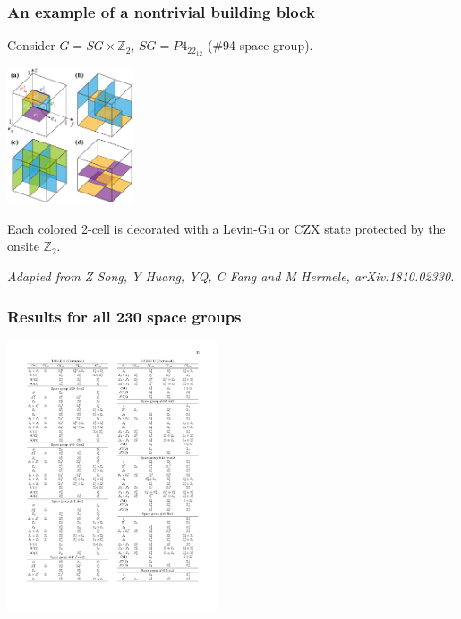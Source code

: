 \documentclass[xcolor=table, 10pt, aspectratio=43]{beamer}
\begin{document}
\begin{frame}
\frametitle{An example of a nontrivial building block}
Consider $G=SG\times\mathbb Z_2$, $SG=P4_22_12$ (\#94 space group).
\begin{center}
\includegraphics[height=4cm]{blocks}
\end{center}
Each colored 2-cell is decorated with a Levin-Gu or CZX state protected by the onsite $\mathbb Z_2$.

\emph{\small Adapted from Z Song, Y Huang, YQ, C Fang and M Hermele, arXiv:1810.02330.}
\end{frame}

\begin{frame}
	\frametitle{Results for all 230 space groups}
	\begin{center}
		\includegraphics[height=8cm]{bigtable}
	\end{center}
\end{frame}
\end{document}
